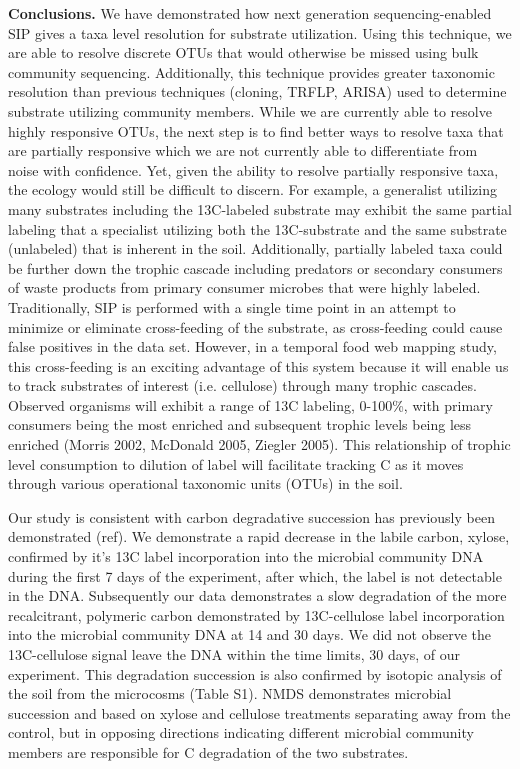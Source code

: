 
\textbf{Conclusions.} We have demonstrated how next generation sequencing-enabled SIP gives a taxa level resolution for substrate utilization. Using this technique, we are able to resolve discrete OTUs that would otherwise be missed using bulk community sequencing. Additionally, this technique provides greater taxonomic resolution than previous techniques (cloning, TRFLP, ARISA) used to determine substrate utilizing community members. While we are currently able to resolve highly responsive OTUs, the next step is to find better ways to resolve taxa that are partially responsive which we are not currently able to differentiate from noise with confidence.  Yet, given the ability to resolve partially responsive taxa, the ecology would still be difficult to discern.  For example, a generalist utilizing many substrates including the 13C-labeled substrate may exhibit the same partial labeling that a specialist utilizing both the 13C-substrate and the same substrate (unlabeled) that is inherent in the soil. Additionally, partially labeled taxa could be further down the trophic cascade including predators or secondary consumers of waste products from primary consumer microbes that were highly labeled.     
Traditionally, SIP is performed with a single time point in an attempt to minimize or eliminate cross-feeding of the substrate, as cross-feeding could cause false positives in the data set.  However, in a temporal food web mapping study, this cross-feeding is an exciting advantage of this system because it will enable us to track substrates of interest (i.e. cellulose) through many trophic cascades.  Observed organisms will exhibit a range of 13C labeling, 0-100\%, with primary consumers being the most enriched and subsequent trophic levels being less enriched (Morris 2002, McDonald 2005, Ziegler 2005).  This relationship of trophic level consumption to dilution of label will facilitate tracking C as it moves through various operational taxonomic units (OTUs) in the soil. 

Our study is consistent with carbon degradative succession has previously been demonstrated (ref). We demonstrate a rapid decrease in the labile carbon, xylose, confirmed by it’s 13C label incorporation into the microbial community DNA during the first 7 days of the experiment, after which, the label is not detectable in the DNA. Subsequently our data demonstrates a slow degradation of the more recalcitrant, polymeric carbon demonstrated by 13C-cellulose label incorporation into the microbial community DNA at 14 and 30 days.  We did not observe the 13C-cellulose signal leave the DNA within the time limits, 30 days, of our experiment.  This degradation succession is also confirmed by isotopic analysis of the soil from the microcosms (Table S1). NMDS demonstrates microbial succession and based on xylose and cellulose treatments separating away from the control, but in opposing directions indicating different microbial community members are responsible for C degradation of the two substrates. 

